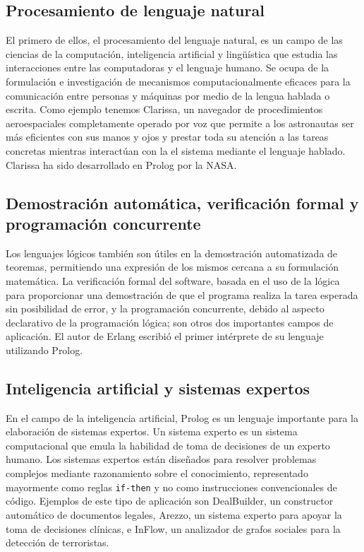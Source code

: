 \documentclass[11pt,captions=nooneline,DIV=14, parskip=full]{scrartcl}
\begin{document}
\subsection{Procesamiento de lenguaje natural}
El primero de ellos, el procesamiento del lenguaje natural, es un campo de las ciencias de la computación, inteligencia artificial y lingüística que estudia las interacciones entre las computadoras y el lenguaje humano. Se ocupa de la formulación e investigación de mecanismos computacionalmente eficaces para la comunicación entre personas y máquinas por medio de la lengua hablada o escrita. Como ejemplo tenemos Clarissa, un navegador de procedimientos aeroespaciales completamente operado por voz que permite a los astronautas ser más eficientes con sus manos y ojos y prestar toda su atención a las tareas concretas mientras interactúan con la el sistema mediante el lenguaje hablado. Clarissa ha sido desarrollado en Prolog por la NASA.

\subsection{Demostración automática, verificación formal y programación concurrente}
Los lenguajes lógicos también son útiles en la demostración automatizada de teoremas, permitiendo una expresión de los mismos cercana a su formulación matemática. La verificación formal del software, basada en el uso de la lógica para proporcionar una demostración de que el programa realiza la tarea esperada sin posibilidad de error, y la programación concurrente, debido al aspecto declarativo de la programación lógica; son otros dos importantes campos de aplicación. El autor de Erlang escribió el primer intérprete de su lenguaje utilizando Prolog.

\subsection{Inteligencia artificial y sistemas expertos}
En el campo de la inteligencia artificial, Prolog es un lenguaje importante para la elaboración de sistemas expertos. Un sistema experto es un sistema computacional que emula la habilidad de toma de decisiones de un experto humano. Los sistemas expertos están diseñados para resolver problemas complejos mediante razonamiento sobre el conocimiento, representado mayormente como reglas \texttt{if-then} y no como instrucciones convencionales de código. Ejemplos de este tipo de aplicación son DealBuilder, un constructor automático de documentos legales, Arezzo, un sistema experto para apoyar la toma de decisiones clínicas, e InFlow, un analizador de grafos sociales para la detección de terroristas.
\end{document}
